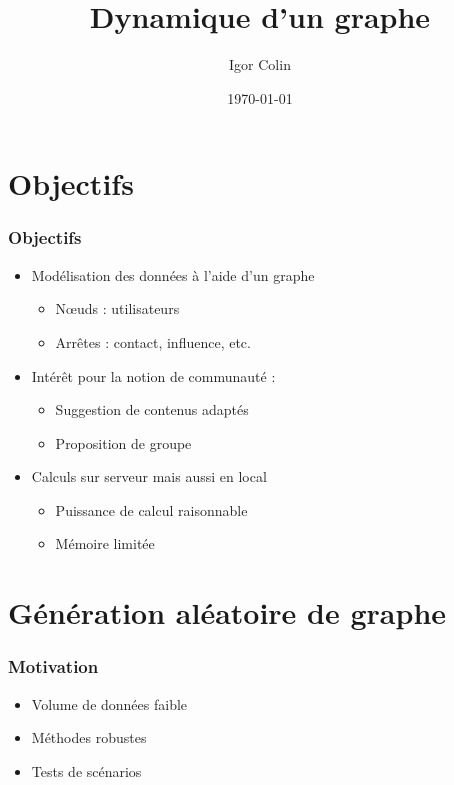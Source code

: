 \documentclass[c]{beamer}
\title{Dynamique d'un graphe}
\author{Igor Colin}
\date{\today}
\begin{document}

\section{Objectifs}

\begin{frame}
    \frametitle{Objectifs}

    \begin{itemize}
        \item<1-> Modélisation des données à l'aide d'un graphe
            \begin{itemize}
                \item N\oe{}uds : utilisateurs
                \item Arrêtes : contact, influence, etc.
            \end{itemize}
        \item<2-> Intérêt pour la notion de communauté :
            \begin{itemize}
                \item Suggestion de contenus adaptés
                \item Proposition de groupe
            \end{itemize}
        \item<3-> Calculs sur serveur mais aussi en local
            \begin{itemize}
                \item Puissance de calcul raisonnable
                \item Mémoire limitée
            \end{itemize}
    \end{itemize}
\end{frame}

\section{Génération aléatoire de graphe}

\begin{frame}
    \frametitle{Motivation}

    \begin{itemize}
        \item<1-> Volume de données faible
        \item<2-> Méthodes robustes
        \item<3-> Tests de scénarios
    \end{itemize}
\end{frame}
\end{document}
